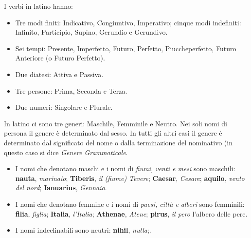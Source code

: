 \documentclass[nols]{tufte-handout}
\newcommand{\textls}[2][5]{%
    \begingroup\addfontfeatures{LetterSpace=#1}#2\endgroup
  }
\renewcommand{\smallcapsspacing}[1]{\textls[10]{#1}}
\renewcommand{\textsc}[1]{\smallcapsspacing{\textsmallcaps{#1}}}
\begin{document}
 I verbi in latino hanno:
\begin{itemize}
\item[\textsc{1.}] Tre modi finiti: Indicativo, Congiuntivo, Imperativo; cinque modi indefiniti: Infinito, Participio, Supino, Gerundio e Gerundivo.  
\item[\textsc{2.}] Sei tempi: Presente, Imperfetto, Futuro, Perfetto, Piuccheperfetto, Futuro Anteriore (o Futuro Perfetto).  
\item[\textsc{3.}] Due diatesi: Attiva e Passiva.  
\item[\textsc{4.}] Tre persone: Prima, Seconda e Terza.
\item[\textsc{5.}] Due numeri: Singolare e Plurale.  
\end{itemize}

 In latino ci sono tre generi: Maschile, Femminile e Neutro. Nei soli nomi di persona il genere è determinato dal sesso. In tutti gli altri casi il genere è determinato dal significato del nome o dalla terminazione del nominativo (in questo caso si dice \textit{Genere Grammaticale}. 

\begin{itemize}
\item[\textsc{1.}] I nomi che denotano maschi e i nomi di \textit{fiumi, venti e mesi} sono maschili:  
\textbf{nauta}, \textit{marinaio}; 
\textbf{Tiberis}, \textit{il (fiume) Tevere}; 
\textbf{Caesar}, \textit{Cesare}; 
\textbf{aquilo}, \textit{vento del nord}; 
\textbf{Ianuarius}, \textit{Gennaio}.  
\item[\textsc{2.}] I nomi che denotano femmine e i nomi di \textit{paesi, città e alberi} sono femminili: 
\textbf{filia}, \textit{figlia}; 
\textbf{Italia}, \textit{l'Italia}; 
\textbf{Athenae}, \textit{Atene}; 
\textbf{pirus}, \textit{il pero} l'albero delle pere.  
\item[\textsc{3.}] I nomi indeclinabili sono neutri: \textbf{nihil}, \textit{nulla};.  
\end{itemize}
\end{document}
